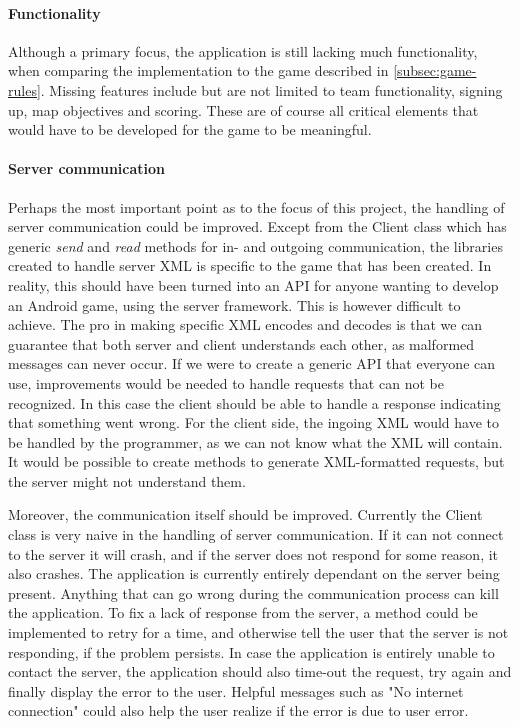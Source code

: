 \paragraph{Functionality}
Although a primary focus, the application is still lacking much functionality, when comparing the implementation to the game described in \ref{subsec:game-rules}. Missing features include but are not limited to team functionality, signing up, map objectives and scoring. These are of course all critical elements that would have to be developed for the game to be meaningful.

\paragraph{Server communication}
Perhaps the most important point as to the focus of this project, the handling of server communication could be improved. Except from the Client class which has generic \textit{send} and \textit{read} methods for in- and outgoing communication, the libraries created to handle server XML is specific to the game that has been created. In reality, this should have been turned into an API for anyone wanting to develop an Android game, using the server framework. This is however difficult to achieve. The pro in making specific XML encodes and decodes is that we can guarantee that both server and client understands each other, as malformed messages can never occur. If we were to create a generic API that everyone can use, improvements would be needed to handle requests that can not be recognized. In this case the client should be able to handle a response indicating that something went wrong. For the client side, the ingoing XML would have to be handled by the programmer, as we can not know what the XML will contain. It would be possible to create methods to generate XML-formatted requests, but the server might not understand them. 

Moreover, the communication itself should be improved. Currently the Client class is very naive in the handling of server communication. If it can not connect to the server it will crash, and if the server does not respond for some reason, it also crashes. The application is currently entirely dependant on the server being present. Anything that can go wrong during the communication process can kill the application. To fix a lack of response from the server, a method could be implemented to retry for a time, and otherwise tell the user that the server is not responding, if the problem persists. In case the application is entirely unable to contact the server, the application should also time-out the request, try again and finally display the error to the user. Helpful messages such as "No internet connection" could also help the user realize if the error is due to user error.